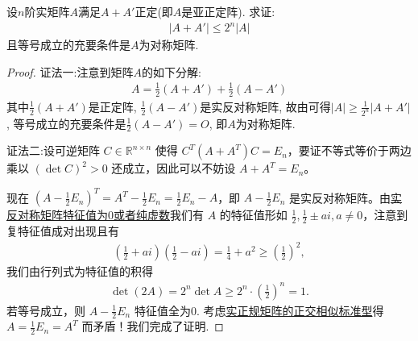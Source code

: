 \documentclass[../../main.tex]{subfiles}%
\begin{document}
\begin{proposition}\label{proposition:例9.115}
设\( n \)阶实矩阵\( A \)满足\( A+A' \)正定(即\( A \)是亚正定阵). 求证:
\begin{align*}
|A+A'| \leqslant 2^n|A|
\end{align*}
且等号成立的充要条件是\( A \)为对称矩阵.
\end{proposition}
\begin{proof}

{\color{blue}证法一:}注意到矩阵\( A \)的如下分解:
\begin{align*}
A = \frac{1}{2}(A+A') + \frac{1}{2}(A-A')
\end{align*}
其中\( \frac{1}{2}(A+A') \)是正定阵, \( \frac{1}{2}(A-A') \)是实反对称矩阵, 故由可得\( |A| \geqslant \frac{1}{2^n}|A+A'| \), 等号成立的充要条件是\( \frac{1}{2}(A-A') = O \), 即\( A \)为对称矩阵.

{\color{blue}证法二:}设可逆矩阵 \( C \in \mathbb{R}^{n \times n} \) 使得 \( C^T (A + A^T) C = E_n \)，要证不等式等价于两边乘以 \( (\det C)^2 > 0 \) 还成立，因此可以不妨设 \( A + A^T = E_n \)。

现在 \( (A - \frac{1}{2}E_n)^T = A^T - \frac{1}{2}E_n = \frac{1}{2}E_n - A \)，即 \( A - \frac{1}{2}E_n \) 是实反对称矩阵。由\hyperref[proposition:实对称(反称)阵的特征值]{实反对称矩阵特征值为0或者纯虚数}我们有 \( A \) 的特征值形如 \( \frac{1}{2}, \frac{1}{2} \pm ai, a \neq 0 \)，注意到复特征值成对出现且有
\begin{align*}
\left( \frac{1}{2} + ai \right) \left( \frac{1}{2} - ai \right) = \frac{1}{4} + a^2 \geqslant \left( \frac{1}{2} \right)^2,
\end{align*}
我们由行列式为特征值的积得
\begin{align*}
\det (2A) = 2^n \det A \geqslant 2^n \cdot \left( \frac{1}{2} \right)^n = 1.
\end{align*}
若等号成立，则 \( A - \frac{1}{2}E_n \) 特征值全为0. 考虑\hyperref[theorem:实正规矩阵的正交相似标准型]{实正规矩阵的正交相似标准型}得 \( A = \frac{1}{2}E_n = A^T \) 而矛盾！我们完成了证明.
\end{proof}
\end{document}
